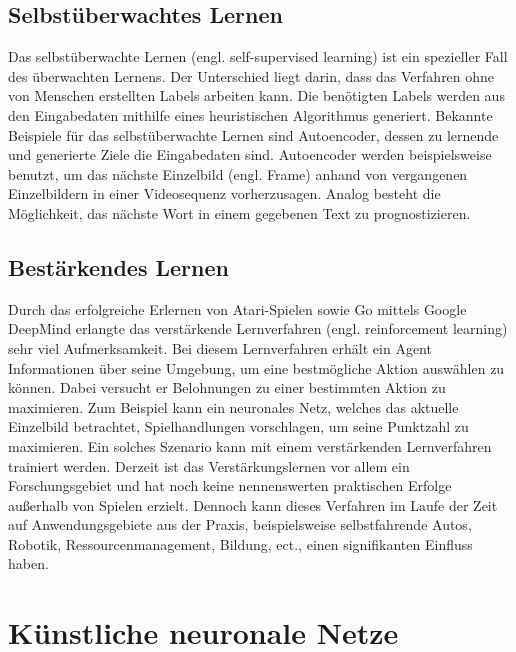 \subsection{Selbstüberwachtes Lernen}

Das selbstüberwachte Lernen (engl. self-supervised learning) ist ein spezieller Fall des überwachten Lernens. Der Unterschied liegt darin, dass das Verfahren ohne von Menschen erstellten Labels arbeiten kann. Die benötigten Labels werden aus den Eingabedaten mithilfe eines heuristischen Algorithmus generiert. Bekannte Beispiele für das selbstüberwachte Lernen sind Autoencoder, dessen zu lernende und generierte Ziele die Eingabedaten sind. Autoencoder werden beispielsweise benutzt, um das nächste Einzelbild (engl. Frame) anhand von vergangenen Einzelbildern in einer Videosequenz vorherzusagen. Analog besteht die Möglichkeit, das nächste Wort in einem gegebenen Text zu prognostizieren\cite{francois}. 



\subsection{Bestärkendes Lernen}

Durch das erfolgreiche Erlernen von Atari-Spielen sowie Go mittels Google DeepMind erlangte das verstärkende Lernverfahren (engl. reinforcement learning) sehr viel Aufmerksamkeit. Bei diesem Lernverfahren erhält ein Agent Informationen über seine Umgebung, um eine bestmögliche Aktion auswählen zu können. Dabei versucht er Belohnungen zu einer bestimmten Aktion zu maximieren. Zum Beispiel kann ein neuronales Netz, welches das aktuelle Einzelbild betrachtet, Spielhandlungen vorschlagen, um seine Punktzahl zu maximieren\cite{francois,Vasilev2019}. Ein solches Szenario kann mit einem verstärkenden Lernverfahren trainiert werden. Derzeit ist das Verstärkungslernen vor allem ein Forschungsgebiet und hat noch keine nennenswerten praktischen Erfolge außerhalb von Spielen erzielt. Dennoch kann dieses Verfahren im Laufe der Zeit auf Anwendungsgebiete aus der Praxis, beispielsweise selbstfahrende Autos, Robotik, Ressourcenmanagement, Bildung, ect., einen signifikanten Einfluss haben\cite{francois}.

\section{Künstliche neuronale Netze}


